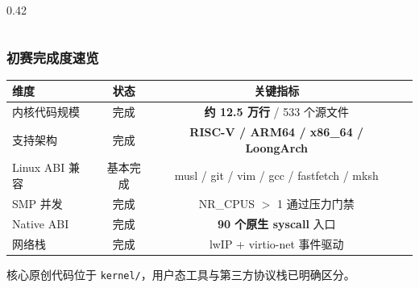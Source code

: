 \documentclass[aspectratio=1610]{beamer}
\newcommand{\code}[1]{\texttt{\footnotesize #1}}
\newcommand{\high}[1]{\textbf{\textcolor{ThemeColor}{#1}}}
\begin{document}
\begin{frame}
\begin{columns}
\begin{column}{0.42\textwidth}
\begin{center}
            \end{center}
        \end{column}
    \end{columns}
\end{frame}

\begin{frame}
    \frametitle{初赛完成度速览}
    \begin{table}
        \centering
        \renewcommand{\arraystretch}{1.25}
        \footnotesize
        \begin{tabular}{lccl}
            \toprule
            \textbf{维度} & \textbf{状态} & \textbf{关键指标} \\
            \midrule
            内核代码规模 & 完成 & \high{约 12.5 万行} / 533 个源文件 \\
            支持架构 & 完成 & \high{RISC-V / ARM64 / x86\_64 / LoongArch} \\
            Linux ABI 兼容 & 基本完成 & musl / git / vim / gcc / fastfetch / mksh \\
            SMP 并发 & 完成 & NR\_CPUS $>$ 1 通过压力门禁 \\
            Native ABI & 完成 & \high{90 个原生 syscall} 入口 \\
            网络栈 & 完成 & lwIP + virtio-net 事件驱动 \\
            \bottomrule
        \end{tabular}
    \end{table}
    \vspace{0.3em}
    \begin{center}
        \small 核心原创代码位于 \code{kernel/}，用户态工具与第三方协议栈已明确区分。
    \end{center}
\end{frame}
\end{document}
